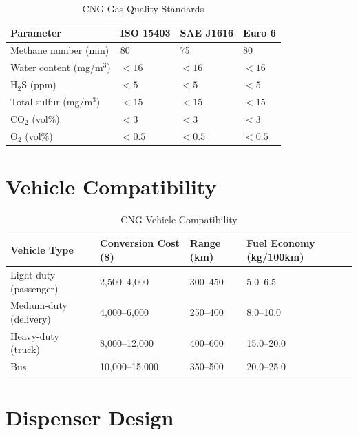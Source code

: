 \documentclass[12pt,twoside,openany]{book}
\newcommand{\tighttabular}{\small\setlength{\tabcolsep}{3.5pt}}
\begin{document}
\begin{table}[htbp]
    \centering
    \caption{CNG Gas Quality Standards}
    \label{tab:cng_quality}
    \begin{tabular}{L{4cm} C{2cm} C{3cm} C{2cm}}
    \hline
    \textbf{Parameter} & \textbf{ISO 15403} & \textbf{SAE J1616} & \textbf{Euro 6} \\
    \hline
    Methane number (min) & 80 & 75 & 80 \\
    Water content (mg/m$^3$) & $<16$ & $<16$ & $<16$ \\
    H$_2$S (ppm) & $<5$ & $<5$ & $<5$ \\
    Total sulfur (mg/m$^3$) & $<15$ & $<15$ & $<15$ \\
    CO$_2$ (vol\%) & $<3$ & $<3$ & $<3$ \\
    O$_2$ (vol\%) & $<0.5$ & $<0.5$ & $<0.5$ \\
    \hline
    \end{tabular}
\end{table}

\section{Vehicle Compatibility}

\begin{table}[htbp]
    \centering
    \tighttabular
    \caption{CNG Vehicle Compatibility}
    \label{tab:cng_vehicles}
    \begin{tabular}{L{3.6cm} C{2.3cm} C{2.2cm} C{2.6cm}}
    \hline
    \textbf{Vehicle Type} & \textbf{Conversion Cost (\$)} & \textbf{Range (km)} & \textbf{Fuel Economy (kg/100km)} \\
    \hline
    Light-duty (passenger) & 2,500--4,000 & 300--450 & 5.0--6.5 \\
    Medium-duty (delivery) & 4,000--6,000 & 250--400 & 8.0--10.0 \\
    Heavy-duty (truck) & 8,000--12,000 & 400--600 & 15.0--20.0 \\
    Bus & 10,000--15,000 & 350--500 & 20.0--25.0 \\
    \hline
    \end{tabular}
\end{table}

\section{Dispenser Design}
\end{document}
